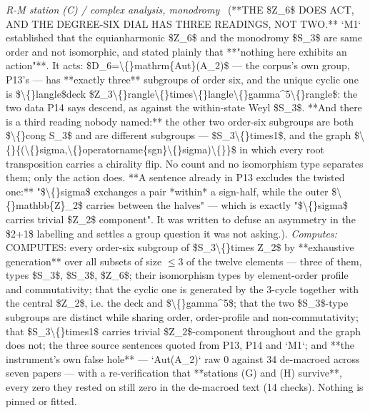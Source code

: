 \begin{description}
\textit{R-M station (C) / complex analysis, monodromy} \ (**THE \$Z\_6\$ DOES ACT, AND THE DEGREE-SIX DIAL HAS THREE READINGS, NOT TWO.** `M1` established that the equianharmonic \$Z\_6\$ and the monodromy \$S\_3\$ are same order and not isomorphic, and stated plainly that **"nothing here exhibits an action"**. It acts: \$D\_6=\textbackslash\{\}mathrm\{Aut\}(A\_2)\$ --- the corpus's own group, P13's --- has **exactly three** subgroups of order six, and the unique cyclic one is \$\textbackslash\{\}langle\$deck \$Z\_3\textbackslash\{\}rangle\textbackslash\{\}times\textbackslash\{\}langle\textbackslash\{\}gamma\textasciicircum{}5\textbackslash\{\}rangle\$: the two data P14 says descend, as against the within-state Weyl \$S\_3\$. **And there is a third reading nobody named:** the other two order-six subgroups are both \$\textbackslash\{\}cong S\_3\$ and are different subgroups --- \$S\_3\textbackslash\{\}times1\$, and the graph \$\textbackslash\{\}\{(\textbackslash\{\}sigma,\textbackslash\{\}operatorname\{sgn\}\textbackslash\{\}sigma)\textbackslash\{\}\}\$ in which every root transposition carries a chirality flip. No count and no isomorphism type separates them; only the action does. **A sentence already in P13 excludes the twisted one:** "\$\textbackslash\{\}sigma\$ exchanges a pair *within* a sign-half, while the outer \$\textbackslash\{\}mathbb\{Z\}\_2\$ carries between the halves" --- which is exactly "\$\textbackslash\{\}sigma\$ carries trivial \$Z\_2\$ component". It was written to defuse an asymmetry in the \$2+1\$ labelling and settles a group question it was not asking.). 
\emph{Computes:} COMPUTES: every order-six subgroup of \$S\_3\textbackslash\{\}times Z\_2\$ by **exhaustive generation** over all subsets of size \ensuremath{\le}3 of the twelve elements --- three of them, types \$S\_3\$, \$S\_3\$, \$Z\_6\$; their isomorphism types by element-order profile and commutativity; that the cyclic one is generated by the 3-cycle together with the central \$Z\_2\$, i.e. the deck and \$\textbackslash\{\}gamma\textasciicircum{}5\$; that the two \$S\_3\$-type subgroups are distinct while sharing order, order-profile and non-commutativity; that \$S\_3\textbackslash\{\}times1\$ carries trivial \$Z\_2\$-component throughout and the graph does not; the three source sentences quoted from P13, P14 and `M1`; and **the instrument's own false hole** --- `Aut(A\_2)` raw 0 against 34 de-macroed across seven papers --- with a re-verification that **stations (G) and (H) survive**, every zero they rested on still zero in the de-macroed text (14 checks). Nothing is pinned or fitted.

\end{description}
